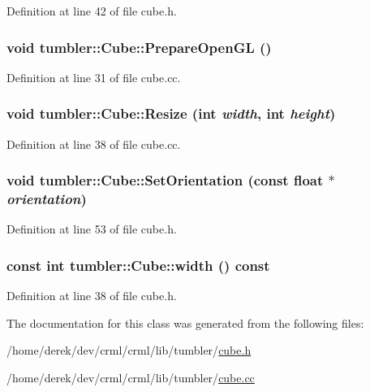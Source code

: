 Definition at line 42 of file cube.h.

\hypertarget{classtumbler_1_1_cube_a62b97b480f8cbccf49cfe650c19590ec}{
\subsubsection[{PrepareOpenGL}]{\setlength{\rightskip}{0pt plus 5cm}void tumbler::Cube::PrepareOpenGL ()}}
\label{classtumbler_1_1_cube_a62b97b480f8cbccf49cfe650c19590ec}


Definition at line 31 of file cube.cc.

\hypertarget{classtumbler_1_1_cube_aa618965575cca4ce046576220d7e45d7}{
\subsubsection[{Resize}]{\setlength{\rightskip}{0pt plus 5cm}void tumbler::Cube::Resize (int {\em width}, \/  int {\em height})}}
\label{classtumbler_1_1_cube_aa618965575cca4ce046576220d7e45d7}


Definition at line 38 of file cube.cc.

\hypertarget{classtumbler_1_1_cube_af2dfb9b62408f6c2773a88653c753860}{
\subsubsection[{SetOrientation}]{\setlength{\rightskip}{0pt plus 5cm}void tumbler::Cube::SetOrientation (const float $\ast$ {\em orientation})}}
\label{classtumbler_1_1_cube_af2dfb9b62408f6c2773a88653c753860}


Definition at line 53 of file cube.h.

\hypertarget{classtumbler_1_1_cube_ab943f389a373cb1388662e5f6a6b784e}{
\subsubsection[{width}]{\setlength{\rightskip}{0pt plus 5cm}const int tumbler::Cube::width () const}}
\label{classtumbler_1_1_cube_ab943f389a373cb1388662e5f6a6b784e}


Definition at line 38 of file cube.h.



The documentation for this class was generated from the following files:\begin{DoxyCompactItemize}
\item 
/home/derek/dev/crml/crml/lib/tumbler/\hyperlink{cube_8h}{cube.h}\item 
/home/derek/dev/crml/crml/lib/tumbler/\hyperlink{cube_8cc}{cube.cc}\end{DoxyCompactItemize}
